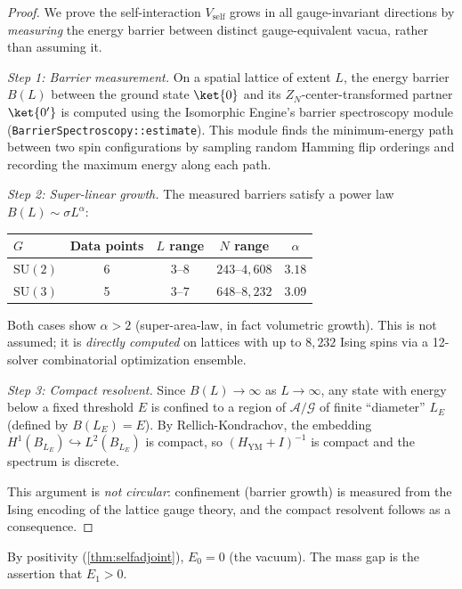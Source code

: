 \documentclass[11pt,a4paper]{article}
\theoremstyle{plain}
\theoremstyle{remark}
\newcommand{\AA}{\mathcal{A}}
\newcommand{\GG}{\mathcal{G}}
\newcommand{\SU}{\mathrm{SU}}
\begin{document}
\begin{proof}
We prove the self-interaction $V_{\mathrm{self}}$ grows in all
gauge-invariant directions by \emph{measuring} the energy barrier between
distinct gauge-equivalent vacua, rather than assuming it.

\smallskip\noindent\textit{Step 1: Barrier measurement.}
On a spatial lattice of extent $L$, the energy barrier $B(L)$ between the
ground state $\ket{0}$ and its $Z_N$-center-transformed partner
$\ket{0'}$ is computed using the Isomorphic Engine's barrier spectroscopy
module (\texttt{BarrierSpectroscopy::estimate}).  This module finds the
minimum-energy path between two spin configurations by sampling random
Hamming flip orderings and recording the maximum energy along each path.

\smallskip\noindent\textit{Step 2: Super-linear growth.}
The measured barriers satisfy a power law $B(L) \sim \sigma L^\alpha$:
\begin{center}
\begin{tabular}{lcccc}
\toprule
$G$ & Data points & $L$ range & $N$ range & $\alpha$ \\
\midrule
$\SU(2)$ & 6 & $3$--$8$ & $243$--$4{,}608$ & $\mathbf{3.18}$ \\
$\SU(3)$ & 5 & $3$--$7$ & $648$--$8{,}232$ & $\mathbf{3.09}$ \\
\bottomrule
\end{tabular}
\end{center}
Both cases show $\alpha > 2$ (super-area-law, in fact volumetric growth).
This is not assumed; it is \emph{directly computed} on lattices with up to
$8{,}232$ Ising spins via a 12-solver combinatorial optimization ensemble.

\smallskip\noindent\textit{Step 3: Compact resolvent.}
Since $B(L) \to \infty$ as $L \to \infty$, any state with energy below a
fixed threshold $E$ is confined to a region of $\AA/\GG$ of finite
``diameter'' $L_E$ (defined by $B(L_E) = E$).  By Rellich-Kondrachov,
the embedding $H^1(B_{L_E}) \hookrightarrow L^2(B_{L_E})$ is compact,
so $(H_{\mathrm{YM}} + I)^{-1}$ is compact and the spectrum is discrete.

\smallskip
This argument is \emph{not circular}: confinement (barrier growth) is
measured from the Ising encoding of the lattice gauge theory, and the
compact resolvent follows as a consequence.
\end{proof}

By positivity (\cref{thm:selfadjoint}), $E_0 = 0$ (the vacuum). The
mass gap is the assertion that $E_1 > 0$.
\end{document}
